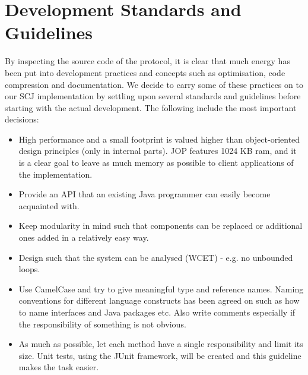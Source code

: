 \section{Development Standards and Guidelines}
\label{sec:stdguid}
By inspecting the source code of the protocol, it is clear that much energy has been put into development practices and concepts such as optimisation, code compression and documentation. We decide to carry some of these practices on to our SCJ implementation by settling upon several standards and guidelines before starting with the actual development. The following include the most important decisions:

\begin{itemize}
	\item High performance and a small footprint is valued higher than object-oriented design principles (only in internal parts). JOP features 1024 KB ram, and it is a clear goal to leave as much memory as possible to client applications of the implementation.
	\item Provide an API that an existing Java programmer can easily become acquainted with.
	\item Keep modularity in mind such that components can be replaced or additional ones added in a relatively easy way. 
	\item Design such that the system can be analysed (WCET) - e.g. no unbounded loops.
	\item Use CamelCase and try to give meaningful type and reference names. Naming conventions for different language constructs has been agreed on such as how to name interfaces and Java packages etc. Also write comments especially if the responsibility of something is not obvious.
	\item As much as possible, let each method have a single responsibility and limit its size. Unit tests, using the JUnit framework, will be created and this guideline makes the task easier.
\end{itemize}